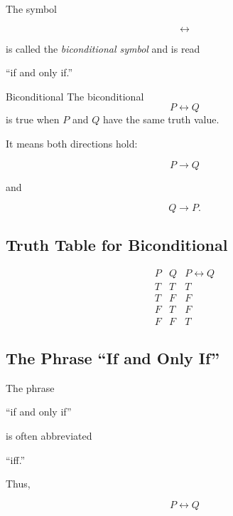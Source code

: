 The symbol

\[ \leftrightarrow \]

is called the \emph{biconditional symbol} and is read

\begin{center}
``if and only if.''
\end{center}

\begin{definitionbox}{Biconditional}
The biconditional
\[ P\leftrightarrow Q \]
is true when \(P\) and \(Q\) have the same truth value.
\end{definitionbox}

It means both directions hold:

\[ P\to Q \]

and

\[ Q\to P. \]

\subsection{Truth Table for Biconditional}
\label{subsec:biconditional-truth-table}

\[
\begin{array}{c|c|c}
P & Q & P\leftrightarrow Q\\ \hline
T & T & T\\
T & F & F\\
F & T & F\\
F & F & T
\end{array}
\]

\subsection{The Phrase ``If and Only If''}
\label{subsec:iff-language}

The phrase

\begin{center}
``if and only if''
\end{center}

is often abbreviated

\begin{center}
``iff.''
\end{center}

Thus,

\[ P\leftrightarrow Q \]

